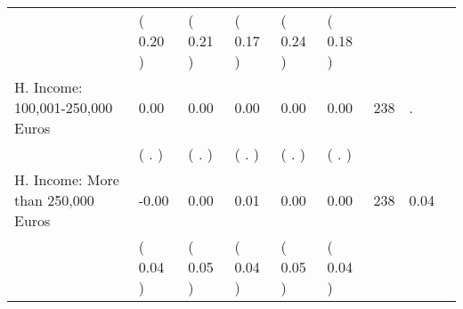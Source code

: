 \begin{tabular}{L{6.2cm} C{1.8cm} C{1.8cm} C{1.8cm} C{1.8cm} C{1.8cm} C{1.8cm} C{0.3cm} C{0.3cm}}
 & (     0.20 ) & (     0.21 ) & (     0.17 ) & (     0.24 ) & (     0.18 )  & \\
H. Income: 100,001-250,000 Euros &      0.00 &      0.00 &      0.00 &      0.00 &      0.00  & 238 &          . \\ 
 & (        . ) & (        . ) & (        . ) & (        . ) & (        . )  & \\
H. Income: More than 250,000 Euros &     -0.00 &      0.00 &      0.01 &      0.00 &      0.00  & 238 &       0.04 \\ 
 & (     0.04 ) & (     0.05 ) & (     0.04 ) & (     0.05 ) & (     0.04 )  & \\
\bottomrule
\end{tabular}
